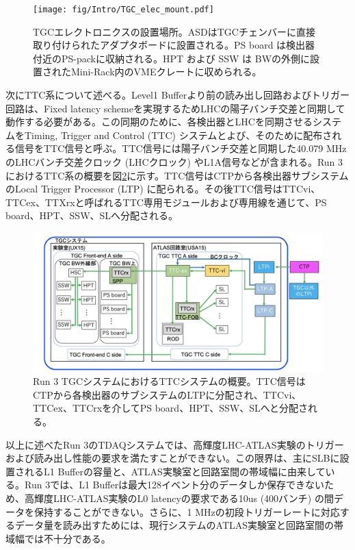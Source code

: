 \begin{figure} 
    \centering
    \texttt{[image: fig/Intro/TGC\_elec\_mount.pdf]}
    \caption[TGCエレクトロニクスが設置されている場所]{TGCエレクトロニクスの設置場所。ASDはTGCチェンバーに直接取り付けられたアダプタボードに設置される。PS board は検出器付近のPS-packに収納される。HPT および SSW は BWの外側に設置されたMini-Rack内のVMEクレートに収められる。}
    \label{TGC_elec_mount}
\end{figure}

次にTTC系について述べる。Level1 Bufferより前の読み出し回路およびトリガー回路は、Fixed latency schemeを実現するためLHCの陽子バンチ交差と同期して動作する必要がある。この同期のために、各検出器とLHCを同期させるシステムをTiming, Trigger and Control  (TTC) システムとよび、そのために配布される信号をTTC信号と呼ぶ。TTC信号には陽子バンチ交差と同期した40.079 MHzのLHCバンチ交差クロック  (LHCクロック) やL1A信号などが含まれる。Run 3におけるTTC系の概要を図\ref{Run3_TTC}に示す。TTC信号はCTPから各検出器サブシステムのLocal Trigger Processor  (LTP) に配られる。その後TTC信号はTTCvi、TTCex、TTXrxと呼ばれるTTC専用モジュールおよび専用線を通じて、PS board、HPT、SSW、SLへ分配される。

\begin{figure} 
\centering
\includegraphics[width=16cm]{fig/Intro/Run3_TTC.png}
\caption[Run 3 TGCシステムにおけるTTCシステムの概要]{Run 3 TGCシステムにおけるTTCシステムの概要\cite{JINST:2008}。TTC信号はCTPから各検出器のサブシステムのLTPに分配され、TTCvi、TTCex、TTCrxを介してPS board、HPT、SSW、SLへと分配される。}
\label{Run3_TTC}
\end{figure}

以上に述べたRun 3のTDAQシステムでは、高輝度LHC-ATLAS実験のトリガーおよび読み出し性能の要求を満たすことができない。この限界は、主にSLBに設置されるL1 Bufferの容量と、ATLAS実験室と回路室間の帯域幅に由来している。Run 3では、L1 Bufferは最大128イベント分のデータしか保存できないため、高輝度LHC-ATLAS実験のL0 latencyの要求である10us  (400バンチ) の間データを保持することができない。さらに、1 MHzの初段トリガーレートに対応するデータ量を読み出すためには、現行システムのATLAS実験室と回路室間の帯域幅では不十分である。

